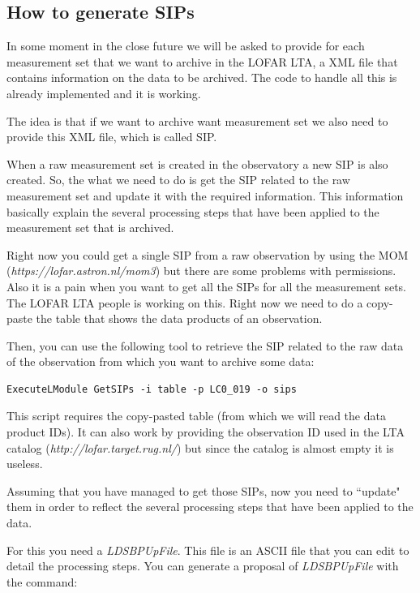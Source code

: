 \documentclass[a4paper,11pt]{article}
\begin{document}
\subsection{How to generate SIPs}

In some moment in the close future we will be asked to provide for each measurement set that we want to archive in the LOFAR LTA, a XML file that contains information on the data to be archived. The code to handle all this is already implemented and it is working.

The idea is that if we want to archive want measurement set we also need to provide this XML file, which is called SIP.

When a raw measurement set is created in the observatory a new SIP is also created. So, the what we need to do is get the SIP related to the raw measurement set and update it with the required information. This information basically explain the several processing steps that have been applied to the measurement set that is archived.

Right now you could get a single SIP from a raw observation by using the MOM (\textit{https://lofar.astron.nl/mom3}) but there are some problems with permissions. Also it is a pain when you want to get all the SIPs for all the measurement sets. The LOFAR LTA people is working on this. Right now we need to do a copy-paste the table that shows the data products of an observation.

Then, you can use the following tool to retrieve the SIP related to the raw data of the observation from which you want to archive some data:

\begin{verbatim}
ExecuteLModule GetSIPs -i table -p LC0_019 -o sips
\end{verbatim}

This script requires the copy-pasted table (from which we will read the data product IDs). It can also work by providing the observation ID used in the LTA catalog (\textit{http://lofar.target.rug.nl/}) but since the catalog is almost empty it is useless.

Assuming that you have managed to get those SIPs, now you need to ``update" them in order to reflect the several processing steps that have been applied to the data.

For this you need a \textit{LDSBPUpFile}. This file is an ASCII file that you can edit to detail the processing steps. You can generate a proposal of \textit{LDSBPUpFile} with the command:
\end{document}
